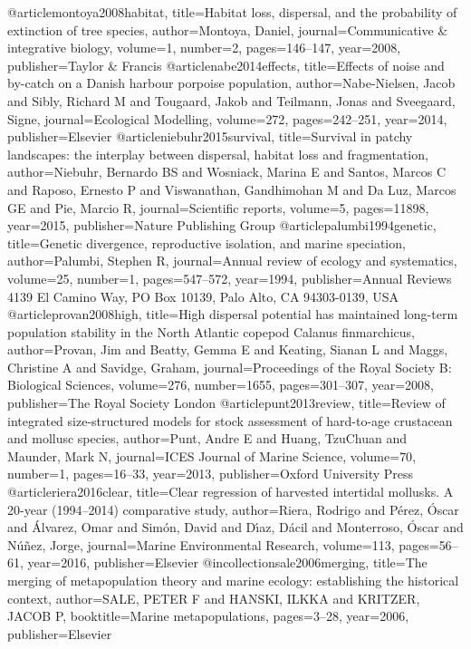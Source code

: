 @article{montoya2008habitat,
	title={Habitat loss, dispersal, and the probability of extinction of tree species},
	author={Montoya, Daniel},
	journal={Communicative \& integrative biology},
	volume={1},
	number={2},
	pages={146--147},
	year={2008},
	publisher={Taylor \& Francis}
}
@article{nabe2014effects,
	title={Effects of noise and by-catch on a Danish harbour porpoise population},
	author={Nabe-Nielsen, Jacob and Sibly, Richard M and Tougaard, Jakob and Teilmann, Jonas and Sveegaard, Signe},
	journal={Ecological Modelling},
	volume={272},
	pages={242--251},
	year={2014},
	publisher={Elsevier}
}
@article{niebuhr2015survival,
	title={Survival in patchy landscapes: the interplay between dispersal, habitat loss and fragmentation},
	author={Niebuhr, Bernardo BS and Wosniack, Marina E and Santos, Marcos C and Raposo, Ernesto P and Viswanathan, Gandhimohan M and Da Luz, Marcos GE and Pie, Marcio R},
	journal={Scientific reports},
	volume={5},
	pages={11898},
	year={2015},
	publisher={Nature Publishing Group}
}
@article{palumbi1994genetic,
	title={Genetic divergence, reproductive isolation, and marine speciation},
	author={Palumbi, Stephen R},
	journal={Annual review of ecology and systematics},
	volume={25},
	number={1},
	pages={547--572},
	year={1994},
	publisher={Annual Reviews 4139 El Camino Way, PO Box 10139, Palo Alto, CA 94303-0139, USA}
}
@article{provan2008high,
	title={High dispersal potential has maintained long-term population stability in the North Atlantic copepod Calanus finmarchicus},
	author={Provan, Jim and Beatty, Gemma E and Keating, Sianan L and Maggs, Christine A and Savidge, Graham},
	journal={Proceedings of the Royal Society B: Biological Sciences},
	volume={276},
	number={1655},
	pages={301--307},
	year={2008},
	publisher={The Royal Society London}
}
@article{punt2013review,
	title={Review of integrated size-structured models for stock assessment of hard-to-age crustacean and mollusc species},
	author={Punt, Andre E and Huang, TzuChuan and Maunder, Mark N},
	journal={ICES Journal of Marine Science},
	volume={70},
	number={1},
	pages={16--33},
	year={2013},
	publisher={Oxford University Press}
}
@article{riera2016clear,
	title={Clear regression of harvested intertidal mollusks. A 20-year (1994--2014) comparative study},
	author={Riera, Rodrigo and P{\'e}rez, {\'O}scar and {\'A}lvarez, Omar and Sim{\'o}n, David and D{\'\i}az, D{\'a}cil and Monterroso, {\'O}scar and N{\'u}{\~n}ez, Jorge},
	journal={Marine Environmental Research},
	volume={113},
	pages={56--61},
	year={2016},
	publisher={Elsevier}
}
@incollection{sale2006merging,
	title={The merging of metapopulation theory and marine ecology: establishing the historical context},
	author={SALE, PETER F and HANSKI, ILKKA and KRITZER, JACOB P},
	booktitle={Marine metapopulations},
	pages={3--28},
	year={2006},
	publisher={Elsevier}
}
